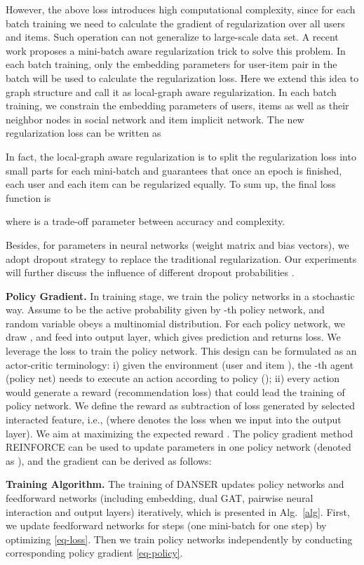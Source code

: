 \documentclass[sigconf]{acmart}
\begin{document}
However, the above loss introduces high computational complexity, since for each batch training we need to calculate the gradient of regularization over all users and items. Such operation can not generalize to large-scale data set. A recent work \cite{deepinterest} proposes a mini-batch aware regularization trick to solve this problem. In each batch training, only the embedding parameters for user-item pair  in the batch will be used to calculate the regularization loss. Here we extend this idea to graph structure and call it as local-graph aware regularization. In each batch training, we constrain the embedding parameters of users, items as well as their neighbor nodes in social network and item implicit network. The new regularization loss can be written as

In fact, the local-graph aware regularization is to split the regularization loss into small parts for each mini-batch and guarantees that once an epoch is finished, each user and each item can be regularized equally.
To sum up, the final loss function is

where  is a trade-off parameter between accuracy and complexity. 

Besides, for parameters in neural networks (weight matrix and bias vectors), we adopt dropout strategy to replace the traditional regularization. Our experiments will further discuss the influence of different dropout probabilities .

\textbf{Policy Gradient.} In training stage, we train the policy networks in a stochastic way. Assume  to be the active probability given by -th policy network, and random variable  obeys a multinomial distribution. For each policy network, we draw , and feed  into output layer, which gives prediction and returns loss. We leverage the loss to train the policy network. This design can be formulated as an actor-critic terminology: i) given the environment (user  and item ), the -th agent (policy net) needs to execute an action according to policy (); ii) every action would generate a reward (recommendation loss) that could lead the training of policy network. We define the reward as subtraction of loss generated by selected interacted feature, i.e.,  (where  denotes the loss when we input  into the output layer). We aim at maximizing the expected reward . The policy gradient method REINFORCE \cite{REIN} can be used to update parameters in one policy network (denoted as ), and the gradient can be derived as follows:


\textbf{Training Algorithm.} The training of DANSER updates policy networks and feedforward networks (including embedding, dual GAT, pairwise neural interaction and output layers) iteratively, which is presented in Alg.~\ref{alg}. First, we update feedforward networks for  steps (one mini-batch for one step) by optimizing \eqref{eq-loss}. Then we train  policy networks independently by conducting corresponding policy gradient \eqref{eq-policy}.
\end{document}
